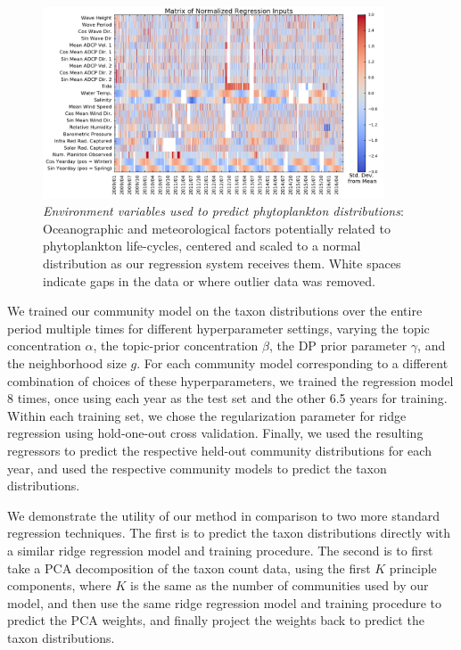 \begin{figure}
    \centering
    \includegraphics[width=0.9\textwidth]{figures/oceans/RegressionInputsNorm.png}
    \caption{\emph{Environment variables used to predict phytoplankton distributions}:
    Oceanographic and meteorological factors potentially related to phytoplankton life-cycles, centered and scaled to a normal distribution as our regression system receives them. White spaces indicate gaps in the data or where outlier data was removed.}
    \label{fig:plankton-mvco-regression-inputs}
\end{figure}

We trained our community model on the taxon distributions over the entire period multiple times for different hyperparameter settings, varying the topic concentration $\alpha$, the topic-prior concentration $\beta$, the DP prior parameter $\gamma$, and the neighborhood size $g$. For each community model corresponding to a different combination of choices of these hyperparameters, we trained the regression model 8 times, once using each year as the test set and the other 6.5 years for training. Within each training set, we chose the regularization parameter for ridge regression using hold-one-out cross validation. Finally, we used the resulting regressors to predict the respective held-out community distributions for each year, and used the respective community models to predict the taxon distributions.

We demonstrate the utility of our method in comparison to two more standard regression techniques. The first is to predict the taxon distributions directly with a similar ridge regression model and training procedure. The second is to first take a PCA decomposition of the taxon count data, using the first $K$ principle components, where $K$ is the same as the number of communities used by our model, and then use the same ridge regression model and training procedure to predict the PCA weights, and finally project the weights back to predict the taxon distributions.

